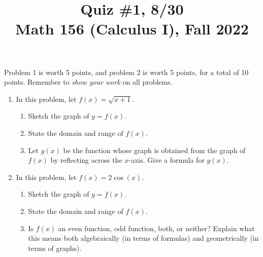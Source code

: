 \documentclass[11pt]{article}
\title{Quiz \#1, 8/30 \\ Math 156 (Calculus I), Fall 2022}
\date{}
\begin{document}
\maketitle

\thispagestyle{empty}

\vspace{-1cm}

Problem 1 is worth 5 points, and problem 2 is worth 5 points, for a total of 10 points. Remember to \emph{show your work} on all problems.

\begin{enumerate}
\item In this problem, let $f(x) = \sqrt{x+1}$.
\begin{enumerate}
\item Sketch the graph of $y=f(x)$.
\item State the domain and range of $f(x)$.
\item Let $g(x)$ be the function whose graph is obtained from the graph of $f(x)$ by reflecting across the $x$-axis. Give a formula for $g(x)$.
\end{enumerate}

\vspace{5cm}

\item In this problem, let $f(x) = 2\cos(x)$.
\begin{enumerate}
\item Sketch the graph of $y=f(x)$.
\item State the domain and range of $f(x)$.
\item Is $f(x)$ an even function, odd function, both, or neither? Explain what this means both algebraically (in terms of formulas) and geometrically (in terms of graphs).
\end{enumerate}

\end{enumerate}
\end{document}
